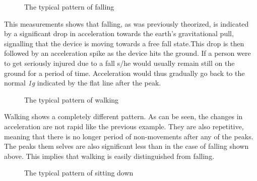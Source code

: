\documentclass[12pt, a4paper, onecolumn]{article}
\begin{document}
		\begin{figure}[h]
			\centering
			\caption{The typical pattern of falling}%
			\label{fig:example}%
		\end{figure}
	
		\noindent This measurements shows that falling, as was previously theorized, is indicated by a significant drop in acceleration towards the earth's gravitational pull, signalling that the device is moving towards a free fall state.This drop is then followed by an acceleration spike as the device hits the ground. If a person were to get seriously injured due to a fall s/he would usually remain still on the ground for a period of time. Acceleration would thus gradually go back to the normal \textit{1g} indicated by the flat line after the peak. 
	
	
		\begin{figure}[h]
			\centering
			\caption{The typical pattern of walking}%
			\label{fig:example}%
		\end{figure}
	
		\noindent Walking shows a completely different pattern. As can be seen, the changes in acceleration are not rapid like the previous example. They are also repetitive, meaning that there is no longer period of non-movements after any of the peaks. The peaks them selves are also significant less than in the case of falling shown above. This implies that walking is easily distinguished from falling.
	
	
	
		\begin{figure}[h]
			\centering
			\caption{The typical pattern of sitting down}%
			\label{fig:example}%
		\end{figure}
	
\end{document}
